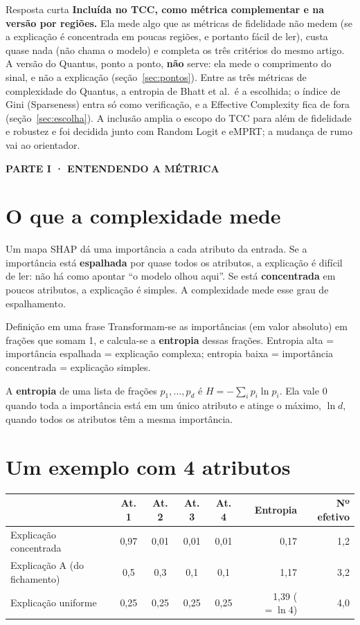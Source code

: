 \documentclass[11pt,a4paper]{article}
\newcommand{\partbar}[1]{\par\vspace{1.2em}\noindent\colorbox{black!80}{\parbox{\dimexpr\linewidth-2\fboxsep}{\color{white}\bfseries\sffamily\MakeUppercase{#1}}}\par\vspace{0.4em}}
\begin{document}
\begin{infobox}[ok]{Resposta curta}
\textbf{Incluída no TCC, como métrica complementar e na versão por regiões.} Ela mede algo que as métricas de fidelidade não medem (se a explicação é concentrada em poucas regiões, e portanto fácil de ler), custa quase nada (não chama o modelo) e completa os três critérios do mesmo artigo. A versão do Quantus, ponto a ponto, \textbf{não} serve: ela mede o comprimento do sinal, e não a explicação (seção~\ref{sec:pontos}). Entre as três métricas de complexidade do Quantus, a entropia de Bhatt et al.\ é a escolhida; o índice de Gini (Sparseness) entra só como verificação, e a Effective Complexity fica de fora (seção~\ref{sec:escolha}). A inclusão amplia o escopo do TCC para além de fidelidade e robustez e foi decidida junto com Random Logit e eMPRT; a mudança de rumo vai ao orientador.
\end{infobox}

\partbar{Parte I · Entendendo a métrica}

\section{O que a complexidade mede}
Um mapa SHAP dá uma importância a cada atributo da entrada. Se a importância está \textbf{espalhada} por quase todos os atributos, a explicação é difícil de ler: não há como apontar “o modelo olhou aqui”. Se está \textbf{concentrada} em poucos atributos, a explicação é simples. A complexidade mede esse grau de espalhamento.

\begin{infobox}[note]{Definição em uma frase}
Transformam-se as importâncias (em valor absoluto) em frações que somam 1, e calcula-se a \textbf{entropia} dessas frações. Entropia alta = importância espalhada = explicação complexa; entropia baixa = importância concentrada = explicação simples.
\end{infobox}

A \textbf{entropia} de uma lista de frações $p_1, \dots, p_d$ é $H = -\sum_i p_i \ln p_i$. Ela vale 0 quando toda a importância está em um único atributo e atinge o máximo, $\ln d$, quando todos os atributos têm a mesma importância.

\section{Um exemplo com 4 atributos}
\begin{center}\small
\begin{tabular}{lccccrr}
\toprule
& \textbf{At. 1} & \textbf{At. 2} & \textbf{At. 3} & \textbf{At. 4} & \textbf{Entropia} & \textbf{Nº efetivo} \\
\midrule
Explicação concentrada & 0,97 & 0,01 & 0,01 & 0,01 & 0,17 & 1,2 \\
Explicação A (do fichamento) & 0,5 & 0,3 & 0,1 & 0,1 & 1,17 & 3,2 \\
Explicação uniforme & 0,25 & 0,25 & 0,25 & 0,25 & 1,39 ($=\ln 4$) & 4,0 \\
\bottomrule
\end{tabular}
\end{center}
\end{document}
